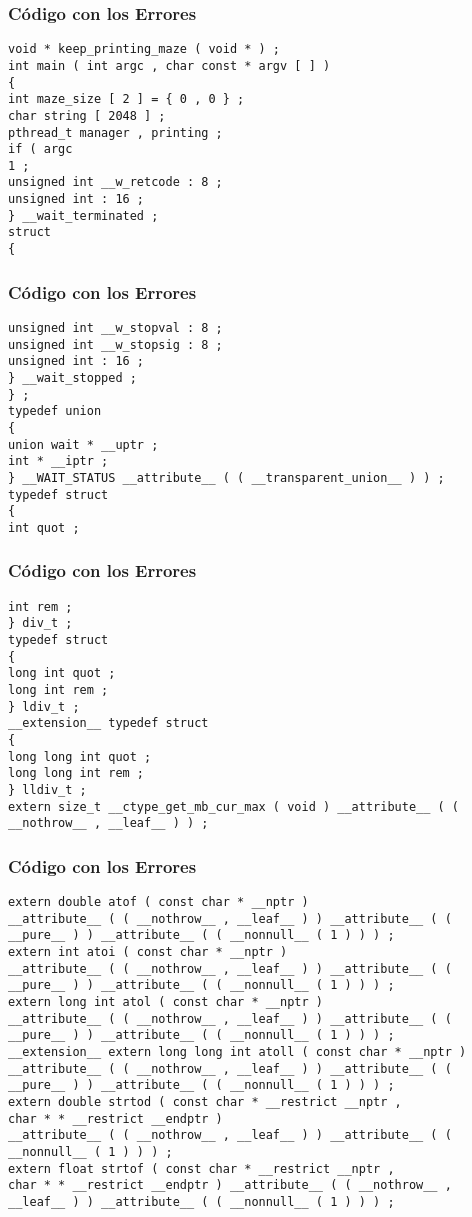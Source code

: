 \documentclass{beamer}
\begin{document}
\begin{frame}[fragile]
\frametitle{C\'odigo con los Errores}
\begin{lstlisting}[style=CStyle]
void * keep_printing_maze ( void * ) ; 
int main ( int argc , char const * argv [ ] ) 
{ 
int maze_size [ 2 ] = { 0 , 0 } ; 
char string [ 2048 ] ; 
pthread_t manager , printing ; 
if ( argc 
1 ; 
unsigned int __w_retcode : 8 ; 
unsigned int : 16 ; 
} __wait_terminated ; 
struct 
{ 
\end{lstlisting}
\end{frame}
\begin{frame}[fragile]
\frametitle{C\'odigo con los Errores}
\begin{lstlisting}[style=CStyle]
unsigned int __w_stopval : 8 ; 
unsigned int __w_stopsig : 8 ; 
unsigned int : 16 ; 
} __wait_stopped ; 
} ; 
typedef union 
{ 
union wait * __uptr ; 
int * __iptr ; 
} __WAIT_STATUS __attribute__ ( ( __transparent_union__ ) ) ; 
typedef struct 
{ 
int quot ; 
\end{lstlisting}
\end{frame}
\begin{frame}[fragile]
\frametitle{C\'odigo con los Errores}
\begin{lstlisting}[style=CStyle]
int rem ; 
} div_t ; 
typedef struct 
{ 
long int quot ; 
long int rem ; 
} ldiv_t ; 
__extension__ typedef struct 
{ 
long long int quot ; 
long long int rem ; 
} lldiv_t ; 
extern size_t __ctype_get_mb_cur_max ( void ) __attribute__ ( ( __nothrow__ , __leaf__ ) ) ; 
\end{lstlisting}
\end{frame}
\begin{frame}[fragile]
\frametitle{C\'odigo con los Errores}
\begin{lstlisting}[style=CStyle]
extern double atof ( const char * __nptr ) 
__attribute__ ( ( __nothrow__ , __leaf__ ) ) __attribute__ ( ( __pure__ ) ) __attribute__ ( ( __nonnull__ ( 1 ) ) ) ; 
extern int atoi ( const char * __nptr ) 
__attribute__ ( ( __nothrow__ , __leaf__ ) ) __attribute__ ( ( __pure__ ) ) __attribute__ ( ( __nonnull__ ( 1 ) ) ) ; 
extern long int atol ( const char * __nptr ) 
__attribute__ ( ( __nothrow__ , __leaf__ ) ) __attribute__ ( ( __pure__ ) ) __attribute__ ( ( __nonnull__ ( 1 ) ) ) ; 
__extension__ extern long long int atoll ( const char * __nptr ) 
__attribute__ ( ( __nothrow__ , __leaf__ ) ) __attribute__ ( ( __pure__ ) ) __attribute__ ( ( __nonnull__ ( 1 ) ) ) ; 
extern double strtod ( const char * __restrict __nptr , 
char * * __restrict __endptr ) 
__attribute__ ( ( __nothrow__ , __leaf__ ) ) __attribute__ ( ( __nonnull__ ( 1 ) ) ) ; 
extern float strtof ( const char * __restrict __nptr , 
char * * __restrict __endptr ) __attribute__ ( ( __nothrow__ , __leaf__ ) ) __attribute__ ( ( __nonnull__ ( 1 ) ) ) ; 
\end{lstlisting}
\end{frame}
\end{document}
